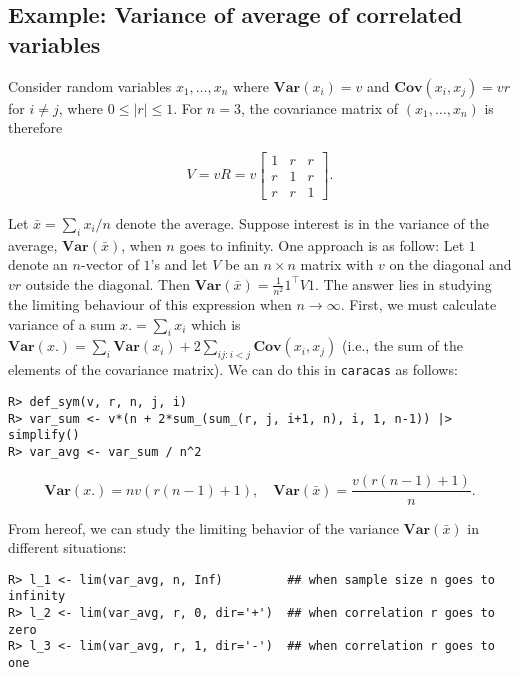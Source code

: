 \hypertarget{example-variance-of-average-of-correlated-variables}{%
\subsection{Example: Variance of average of correlated variables}\label{example-variance-of-average-of-correlated-variables}}

Consider random
variables \(x_1,\dots, x_n\) where \(\mathbf{Var}(x_i)=v\) and \(\mathbf{Cov}(x_i, x_j)=v r\) for \(i\not = j\), where \(0 \le |r| \le1\).
For \(n=3\), the covariance matrix of \((x_1,\dots, x_n)\) is therefore

\begin{equation}
  \label{eq:1}
  V = v R = v \left[\begin{matrix}1 & r & r\\r & 1 & r\\r & r & 1\end{matrix}\right]. 
\end{equation}

Let \(\bar x = \sum_i x_i / n\) denote the average. Suppose interest is
in the variance of the average, \(\mathbf{Var}(\bar x)\), when \(n\) goes to
infinity. One approach is as follow: Let \(1\) denote an \(n\)-vector of
\(1\)'s and let \(V\) be an \(n \times n\) matrix with \(v\) on the diagonal
and \(v r\) outside the diagonal. Then \(\mathbf{Var}(\bar x)=\frac 1 {n^2} 1^\top V 1\). The answer lies in studying the limiting behaviour of
this expression when \(n \rightarrow \infty\).
First, we must calculate variance of a sum \(x. = \sum_i x_i\)
which is \(\mathbf{Var}(x.) = \sum_i \mathbf{Var}(x_i) + 2 \sum_{ij:i<j} \mathbf{Cov}(x_i, x_j)\) (i.e., the sum of the elements of the covariance matrix).
We can do this in \texttt{caracas} as follows:

\begin{verbatim}
R> def_sym(v, r, n, j, i) 
R> var_sum <- v*(n + 2*sum_(sum_(r, j, i+1, n), i, 1, n-1)) |> simplify()
R> var_avg <- var_sum / n^2
\end{verbatim}

\[
\mathbf{Var}(x.) = n v \left(r \left(n - 1\right) + 1\right),
\quad
\mathbf{Var}(\bar x) = \frac{v \left(r \left(n - 1\right) + 1\right)}{n}.
\]

From hereof, we can study the limiting behavior of the variance
\(\mathbf{Var}(\bar x)\) in different situations:

\begin{verbatim}
R> l_1 <- lim(var_avg, n, Inf)         ## when sample size n goes to infinity
R> l_2 <- lim(var_avg, r, 0, dir='+')  ## when correlation r goes to zero
R> l_3 <- lim(var_avg, r, 1, dir='-')  ## when correlation r goes to one
\end{verbatim}

